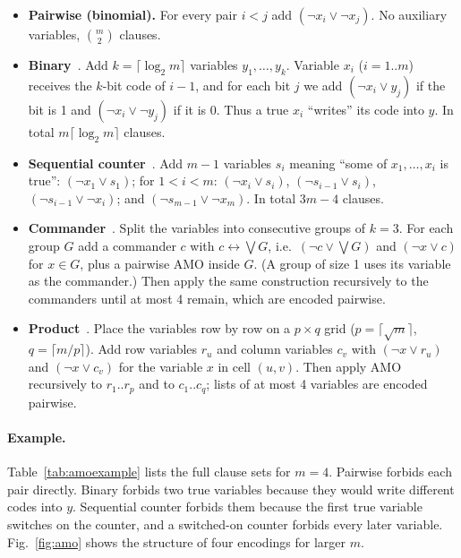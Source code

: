 \begin{itemize}
  \item \textbf{Pairwise (binomial).} For every pair $i<j$ add $(\neg x_i\vee\neg x_j)$. No auxiliary variables, $\binom{m}{2}$ clauses.
  \item \textbf{Binary}~\cite{frisch2010}. Add $k=\lceil\log_2 m\rceil$ variables $y_1,\dots,y_k$. Variable $x_i$ ($i=1..m$) receives the $k$-bit code of $i-1$, and for each bit $j$ we add $(\neg x_i\vee y_j)$ if the bit is 1 and $(\neg x_i\vee\neg y_j)$ if it is 0. Thus a true $x_i$ ``writes'' its code into $y$. In total $m\lceil\log_2 m\rceil$ clauses.
  \item \textbf{Sequential counter}~\cite{sinz2005}. Add $m-1$ variables $s_i$ meaning ``some of $x_1,\dots,x_i$ is true'': $(\neg x_1\vee s_1)$; for $1<i<m$: $(\neg x_i\vee s_i)$, $(\neg s_{i-1}\vee s_i)$, $(\neg s_{i-1}\vee\neg x_i)$; and $(\neg s_{m-1}\vee\neg x_m)$. In total $3m-4$ clauses.
  \item \textbf{Commander}~\cite{klieber2007}. Split the variables into consecutive groups of $k=3$. For each group $G$ add a commander $c$ with $c\leftrightarrow\bigvee G$, i.e.\ $(\neg c\vee\bigvee G)$ and $(\neg x\vee c)$ for $x\in G$, plus a pairwise AMO inside $G$. (A group of size 1 uses its variable as the commander.) Then apply the same construction recursively to the commanders until at most 4 remain, which are encoded pairwise.
  \item \textbf{Product}~\cite{chen2010}. Place the variables row by row on a $p\times q$ grid ($p=\lceil\sqrt m\rceil$, $q=\lceil m/p\rceil$). Add row variables $r_u$ and column variables $c_v$ with $(\neg x\vee r_u)$ and $(\neg x\vee c_v)$ for the variable $x$ in cell $(u,v)$. Then apply AMO recursively to $r_1..r_p$ and to $c_1..c_q$; lists of at most 4 variables are encoded pairwise.
\end{itemize}

\paragraph{Example.} Table~\ref{tab:amoexample} lists the full clause sets for $m=4$. Pairwise forbids each pair directly. Binary forbids two true variables because they would write different codes into $y$. Sequential counter forbids them because the first true variable switches on the counter, and a switched-on counter forbids every later variable. Fig.~\ref{fig:amo} shows the structure of four encodings for larger $m$.

